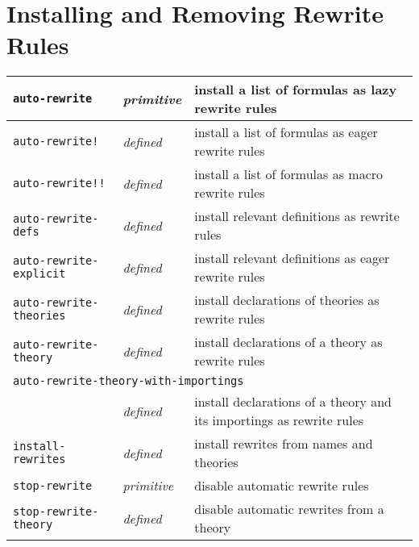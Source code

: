 \documentclass[12pt]{book}
\makeatletter
\newcommand{\indtt}[1]{\texttt{#1}\index{#1@{\texttt{#1}}}}  %
\newcommand{\indttbang}[1]{\texttt{#1!}\index{#1"!@{\texttt{#1"!}}}}
\newcommand{\indttdbang}[1]{\texttt{#1!!}\index{#1"!"!@{\texttt{#1"!"!}}}}
\makeatother
\begin{document}
\section{Installing and Removing Rewrite Rules}
\begin{tabularx}{\textwidth}{|l|l|X|}\hline
\indtt{auto-rewrite} & \emph{primitive}
  & install a list of formulas as lazy rewrite rules\\\hline
\indttbang{auto-rewrite} & \emph{defined}
  & install a list of formulas as eager rewrite rules\\\hline
\indttdbang{auto-rewrite} & \emph{defined}
  & install a list of formulas as macro rewrite rules\\\hline
\indtt{auto-rewrite-defs} & \emph{defined}
  & install relevant definitions as rewrite rules\\\hline
\indtt{auto-rewrite-explicit} & \emph{defined}
  & install relevant definitions as eager rewrite rules\\\hline
\indtt{auto-rewrite-theories} & \emph{defined}
  & install declarations of theories as rewrite rules\\\hline
\indtt{auto-rewrite-theory} & \emph{defined}
  & install declarations of a theory as rewrite rules\\\hline
\multicolumn{3}{|l|}{\indtt{auto-rewrite-theory-with-importings}}\\
  & \emph{defined}
  & install declarations of a theory and its importings as rewrite rules\\\hline
\indtt{install-rewrites} & \emph{defined}
  & install rewrites from names and theories \\\hline 
\indtt{stop-rewrite} & \emph{primitive}
  & disable automatic rewrite rules \\\hline
\indtt{stop-rewrite-theory} & \emph{defined}
  & disable automatic rewrites from a theory\\\hline
\end{tabularx}
\end{document}
